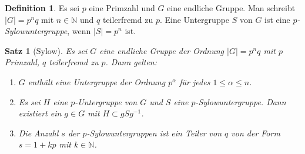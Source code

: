 \documentclass[12pt]{scrartcl} %
\newtheorem{thm}{Satz}[section]
\theoremstyle{definition}
\newtheorem*{defn}{Definition}
\theoremstyle{remark}
\newcommand{\defi}{\emph}
\begin{document}
\begin{defn}
	Es sei \(p\) eine Primzahl und \(G\) eine endliche Gruppe.
	Man schreibt $|G|=p^n q$ mit $n \in \mathbb{N}$ und \(q\) teilerfremd zu \(p\).
	Eine Untergruppe \(S\) von \(G\) ist eine \defi{\(p\)-Sylowuntergruppe}, wenn $|S|=p^n$ ist.
\end{defn}

\begin{thm}[Sylow]
	Es sei \(G\) eine endliche Gruppe der Ordnung $|G|=p^n q$ mit \(p\) Primzahl, \(q\) teilerfremd zu \(p\).
	Dann gelten:
	\begin{enumerate}
	\item \(G\) enthält eine Untergruppe der Ordnung $p^\alpha$ für jedes $1\leq \alpha \leq n$. %
	\item Es sei \(H\) eine \(p\)-Untergruppe von \(G\) und \(S\) eine \(p\)-Sylowuntergruppe.
		Dann existiert ein $g \in G$ mit $H \subset gSg^{-1}$.
	\item Die Anzahl $s$ der \(p\)-Sylowuntergruppen ist ein Teiler von \(q\) von der Form $s=1+kp$ mit $k \in \mathbb{N}$.
	\end{enumerate}
\end{thm}
\end{document}
